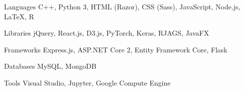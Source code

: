 

\begin{cvskills}

  \cvskill
    {Languages} %
    {C++, Python 3, HTML (Razor), CSS (Sass), JavaScript, Node.js, LaTeX, R} %

  \cvskill
    {Libraries} %
    {jQuery, React.js, D3.js, PyTorch, Keras, RJAGS, JavaFX} %

  \cvskill
    {Frameworks} %
    {Express.js, ASP.NET Core 2, Entity Framework Core, Flask} %

  \cvskill
    {Databases} %
    {MySQL, MongoDB} %
    
  \cvskill
    {Tools} %
    {Visual Studio, Jupyter, Google Compute Engine} %

\end{cvskills}
